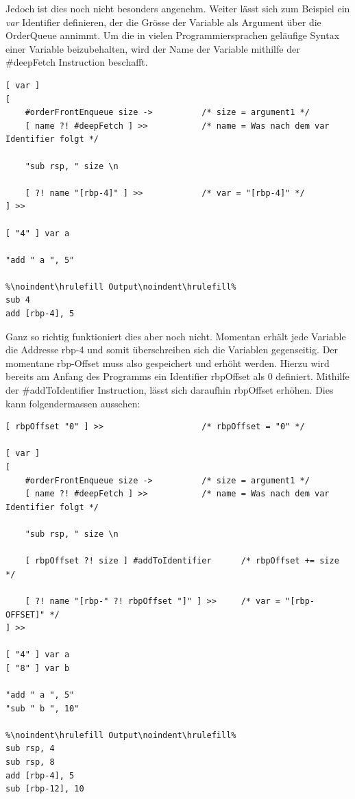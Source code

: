 Jedoch ist dies noch nicht besonders angenehm. Weiter lässt sich zum Beispiel ein \textit{var} Identifier definieren, der die Grösse der Variable als Argument über die OrderQueue annimmt. Um die in vielen Programmiersprachen geläufige Syntax
einer Variable beizubehalten, wird der Name der Variable mithilfe der \#deepFetch Instruction beschafft.

\begin{lstlisting}[language=QHS, caption=Definition einer Variable mit \textit{var} Identifier]
[ var ]
[
    #orderFrontEnqueue size ->          /* size = argument1 */
    [ name ?! #deepFetch ] >>           /* name = Was nach dem var Identifier folgt */

    "sub rsp, " size \n

    [ ?! name "[rbp-4]" ] >>            /* var = "[rbp-4]" */
] >> 

[ "4" ] var a 

"add " a ", 5"
    
%\noindent\hrulefill Output\noindent\hrulefill%
sub 4
add [rbp-4], 5
\end{lstlisting}

Ganz so richtig funktioniert dies aber noch nicht. Momentan erhält jede Variable die Addresse rbp-4 und somit überschreiben sich die Variablen gegenseitig. Der momentane rbp-Offset muss also gespeichert und erhöht werden.
Hierzu wird bereits am Anfang des Programms ein Identifier rbpOffset als 0 definiert. Mithilfe der \#addToIdentifier Instruction, lässt sich daraufhin rbpOffset erhöhen. Dies kann folgendermassen aussehen:

\begin{minipage}{\linewidth}
\begin{lstlisting}[language=QHS, caption=Definition einer Variable mit rbpOffset]
[ rbpOffset "0" ] >>                    /* rbpOffset = "0" */

[ var ]
[
    #orderFrontEnqueue size ->          /* size = argument1 */
    [ name ?! #deepFetch ] >>           /* name = Was nach dem var Identifier folgt */

    "sub rsp, " size \n

    [ rbpOffset ?! size ] #addToIdentifier      /* rbpOffset += size */

    [ ?! name "[rbp-" ?! rbpOffset "]" ] >>     /* var = "[rbp-OFFSET]" */
] >> 

[ "4" ] var a 
[ "8" ] var b 

"add " a ", 5"
"sub " b ", 10"
    
%\noindent\hrulefill Output\noindent\hrulefill%
sub rsp, 4
sub rsp, 8
add [rbp-4], 5
sub [rbp-12], 10
\end{lstlisting}
\end{minipage}

